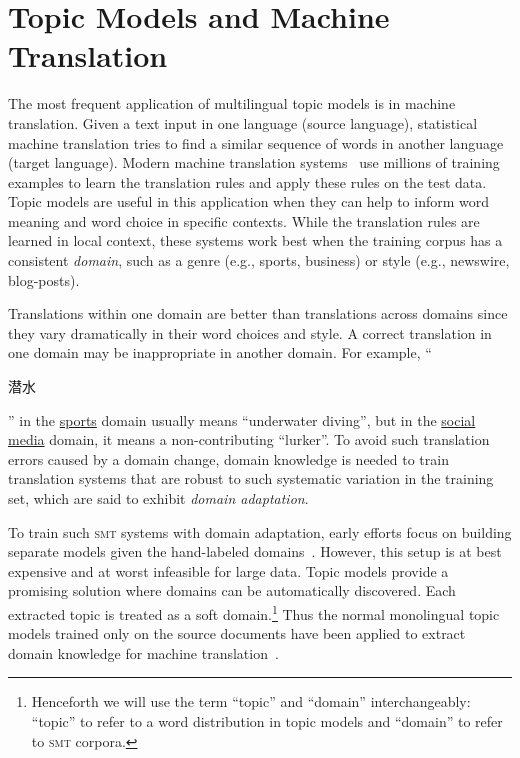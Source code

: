\section{Topic Models and Machine Translation}
\label{sec:tm-mt}

The most frequent application of multilingual topic models is in machine translation.
Given a text input in one language (source language), statistical
machine translation tries to find a similar sequence of words in another
language (target language). Modern machine translation
systems~\citep{koehn-09} use millions of training examples to learn
the translation rules and apply these rules on the test data. 
Topic models are useful in this application when they can help to inform word meaning and word choice in specific contexts.
While the translation rules are learned in local context, these systems work
best when the training corpus has a consistent \emph{domain}, such as a
 genre (e.g., sports, business) or style (e.g.,
newswire, blog-posts). 

Translations within one domain are better than translations across
domains since they vary dramatically in their word choices and style.
A correct translation in one domain may be inappropriate in another
domain.  For example, ``\begin{CJK*}{UTF8}{gbsn}潜水\end{CJK*}'' in the
  \underline{sports} domain usually means ``underwater diving'', but
  in the \underline{social media} domain, it means a non-contributing
  ``lurker''. To avoid such translation errors caused by a domain
  change, domain knowledge is needed to train translation systems that
  are robust to such systematic variation in the training set, which
  are said to exhibit \emph{domain adaptation}.

To train such \textsc{smt} systems with domain adaptation, early
efforts focus on building separate models given the hand-labeled
domains~\citep{foster-07,matsoukas-09,chiang-11}. However, this setup
is at best expensive and at worst infeasible for large data.  Topic
models provide a promising solution where domains can be automatically
discovered. Each extracted topic is treated as a soft
domain.\footnote{Henceforth we will use the term ``topic'' and
  ``domain'' interchangeably: ``topic'' to refer to  a word distribution in
  topic models and ``domain'' to refer to \textsc{smt} corpora.} Thus
the normal monolingual topic models trained only on the source documents have
been applied to extract domain knowledge for machine
translation~\citep{Eidelman-12}.

